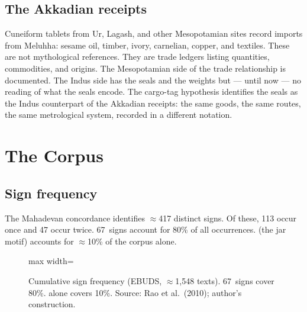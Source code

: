 \subsection{The Akkadian receipts}

Cuneiform tablets from Ur, Lagash, and other Mesopotamian sites
record imports from Meluhha: sesame oil, timber, ivory, carnelian,
copper, and textiles.\smartcite{Ratnagar2004}
These are not mythological references. They are trade ledgers
listing quantities, commodities, and origins.
The Mesopotamian side of the trade relationship is documented.
The Indus side has the seals and the weights but --- until now ---
no reading of what the seals encode.
The cargo-tag hypothesis identifies the seals as the Indus
counterpart of the Akkadian receipts: the same goods, the same
routes, the same metrological system, recorded in a different
notation.

\section{The Corpus}

\subsection{Sign frequency}

The Mahadevan concordance identifies $\approx$417 distinct
signs.\smartcite{Mahadevan1977}
Of these, 113 occur once and 47 occur twice.
67~signs account for 80\% of all occurrences.\smartcite{WikiIndus}
 (the jar motif) accounts for $\approx$10\% of the
corpus alone.

\begin{figure}[ht]
\centering
\begin{adjustbox}{max width=\linewidth}
\end{adjustbox}
\caption{Cumulative sign frequency (EBUDS, $\approx$1{,}548 texts).
67~signs cover 80\%.  alone covers 10\%.
Source: Rao et al.\ (2010); author's construction.}
\label{fig:signfreq}
\end{figure}

